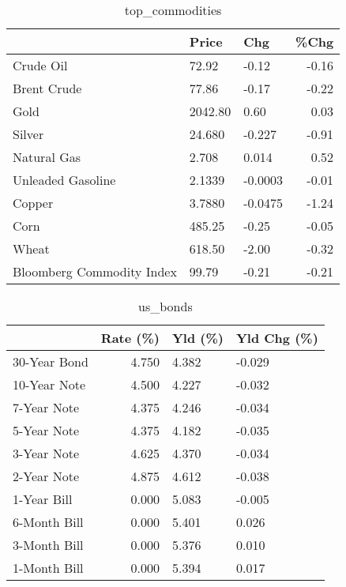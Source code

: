 \documentclass{article}%
\begin{document}
\begin{table}[htbp]%
\caption{top\_commodities}%
\centering%
\begin{adjustbox}{width=1\textwidth}%
\begin{tabular}{lllr}
\toprule
                          &   Price &     Chg &  \%Chg \\
\midrule
               Crude Oil  &   72.92 &   -0.12 & -0.16 \\
             Brent Crude  &   77.86 &   -0.17 & -0.22 \\
                    Gold  & 2042.80 &    0.60 &  0.03 \\
                  Silver  &  24.680 &  -0.227 & -0.91 \\
             Natural Gas  &   2.708 &   0.014 &  0.52 \\
       Unleaded Gasoline  &  2.1339 & -0.0003 & -0.01 \\
                  Copper  &  3.7880 & -0.0475 & -1.24 \\
                    Corn  &  485.25 &   -0.25 & -0.05 \\
                   Wheat  &  618.50 &   -2.00 & -0.32 \\
Bloomberg Commodity Index &   99.79 &   -0.21 & -0.21 \\
\bottomrule
\end{tabular}
%
\end{adjustbox}%
\end{table}

%


\begin{table}[htbp]%
\caption{us\_bonds}%
\centering%
\begin{adjustbox}{width=1\textwidth}%
\begin{tabular}{lrll}
\toprule
             &  Rate (\%) & Yld (\%) & Yld Chg (\%) \\
\midrule
30-Year Bond &     4.750 &   4.382 &      -0.029 \\
10-Year Note &     4.500 &   4.227 &      -0.032 \\
 7-Year Note &     4.375 &   4.246 &      -0.034 \\
 5-Year Note &     4.375 &   4.182 &      -0.035 \\
 3-Year Note &     4.625 &   4.370 &      -0.034 \\
 2-Year Note &     4.875 &   4.612 &      -0.038 \\
 1-Year Bill &     0.000 &   5.083 &      -0.005 \\
6-Month Bill &     0.000 &   5.401 &       0.026 \\
3-Month Bill &     0.000 &   5.376 &       0.010 \\
1-Month Bill &     0.000 &   5.394 &       0.017 \\
\bottomrule
\end{tabular}
%
\end{adjustbox}%
\end{table}
\end{document}

